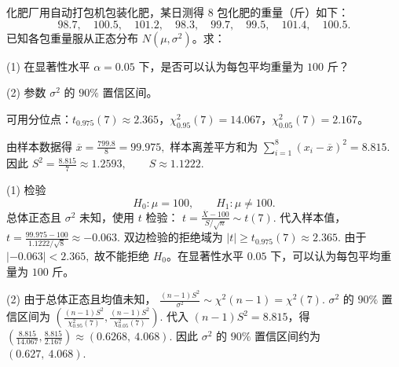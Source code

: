 \documentclass[lang=cn,11pt]{elegantbook}
\begin{document}
\begin{exercise}\label{exer:src-2010-0630-a-07-34credit}
化肥厂用自动打包机包装化肥，某日测得 \(8\) 包化肥的重量（斤）如下：
\[
98.7,\quad 100.5,\quad 101.2,\quad 98.3,\quad
99.7,\quad 99.5,\quad 101.4,\quad 100.5.
\]
已知各包重量服从正态分布 \(N(\mu,\sigma^2)\)。求：\par
(1) 在显著性水平 \(\alpha=0.05\) 下，是否可以认为每包平均重量为 \(100\) 斤？\par
(2) 参数 \(\sigma^2\) 的 \(90\%\) 置信区间。\par
可用分位点：\(t_{0.975}(7)\approx2.365\)，\(\chi^2_{0.95}(7)=14.067\)，\(\chi^2_{0.05}(7)=2.167\)。
\end{exercise}
\begin{solution}
由样本数据得
\(
\overline{x}=\frac{799.8}{8}=99.975,
\)
样本离差平方和为
\(
\sum_{i=1}^8(x_i-\overline{x})^2=8.815.
\)
因此
\(
S^2=\frac{8.815}{7}\approx1.2593,\qquad S\approx1.1222.
\)

(1) 检验
\[
H_0\colon \mu=100,\qquad H_1\colon \mu\ne100.
\]
总体正态且 \(\sigma^2\) 未知，使用 \(t\) 检验：
\(
t=\frac{\overline{X}-100}{S/\sqrt n}\sim t(7).
\)
代入样本值，
\(
t=\frac{99.975-100}{1.1222/\sqrt8}\approx -0.063.
\)
双边检验的拒绝域为
\(
|t|\ge t_{0.975}(7)\approx2.365.
\)
由于
\(
|-0.063|<2.365,
\)
故不能拒绝 \(H_0\)。在显著性水平 \(0.05\) 下，可以认为每包平均重量为 \(100\) 斤。

(2) 由于总体正态且均值未知，
\(
\frac{(n-1)S^2}{\sigma^2}\sim\chi^2(n-1)=\chi^2(7).
\)
\(\sigma^2\) 的 \(90\%\) 置信区间为
\(
\left(
\frac{(n-1)S^2}{\chi^2_{0.95}(7)},
\frac{(n-1)S^2}{\chi^2_{0.05}(7)}
\right).
\)
代入 \((n-1)S^2=8.815\)，得
\(
\left(
\frac{8.815}{14.067},
\frac{8.815}{2.167}
\right)
\approx(0.6268,\ 4.068).
\)
因此 \(\sigma^2\) 的 \(90\%\) 置信区间约为
\(
(0.627,\ 4.068).
\)
\end{solution}
\end{document}
